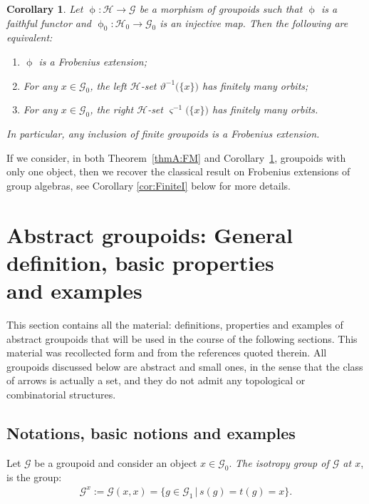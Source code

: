 \documentclass[pdftex]{sigma}
\numberwithin{equation}{section}
\newtheorem{Corollary}[Theorem]{Corollary}
\newcommand{\Go}{\cG_{\Sscript{0}}}
\newcommand{\Ho}{\cH_{\Sscript{0}}}
\newcommand{\cG}{{\mathcal G}}
\newcommand{\cH}{{\mathcal H}}
\newcommand{\Sscript}[1]{\scriptscriptstyle{#1}}
\begin{document}
\begin{Corollary}\label{coroB:Finite}Let $\upphi\colon \cH \to \cG$ be a morphism of groupoids such that $\upphi$ is a faithful functor and $\upphi_{\Sscript{0}}\colon \Ho \to \Go$ is an injective map. Then the following are equivalent:
\begin{enumerate}[$(a)$]\itemsep=0pt
\item $\upphi$ is a Frobenius extension;
\item For any $x \in \Go$, the left $\cH$-set $\vartheta^{-1}\big(\{x\} \big)$ has finitely many orbits;
\item For any $x \in \Go$, the right $\cH$-set $\varsigma^{-1}\big(\{x\} \big)$ has finitely many orbits.
\end{enumerate}
In particular, any inclusion of finite groupoids is a Frobenius extension.
\end{Corollary}

If we consider, in both Theorem~\ref{thmA:FM} and Corollary~\ref{coroB:Finite}, groupoids with only one object, then we recover the classical result on Frobenius extensions of group algebras, see Corollary \ref{cor:FiniteI} below for more details.

\section[Abstract groupoids: General definition, basic properties and examples]{Abstract groupoids: General definition, basic properties\\ and examples}\label{sec:Grpd}
This section contains all the material: definitions, properties and examples of abstract groupoids that will be used in the course of the following sections. This material was recollected form \cite{ElKaoutit:2015, Kaoutit/Kowalzig:14, Kaoutit/Spinosa:2018} and from the references quoted therein. All groupoids discussed below are abstract and small ones, in the sense that the class of arrows is actually a set, and they do not admit any topological or combinatorial structures.

\subsection{Notations, basic notions and examples}\label{ssec:basic}Let $\cG$ be a groupoid and consider an object $x \in \Go$. \emph{The isotropy group of $\cG$ at $x$}, is the group:
\begin{gather}\label{Eq:isotropy}
\cG^{\Sscript{x}}:=\cG(x,x) = \big\{ g \in \cG_{\Sscript{1}}\,|\, s(g)=t(g)=x \big\}.
\end{gather}
\end{document}
